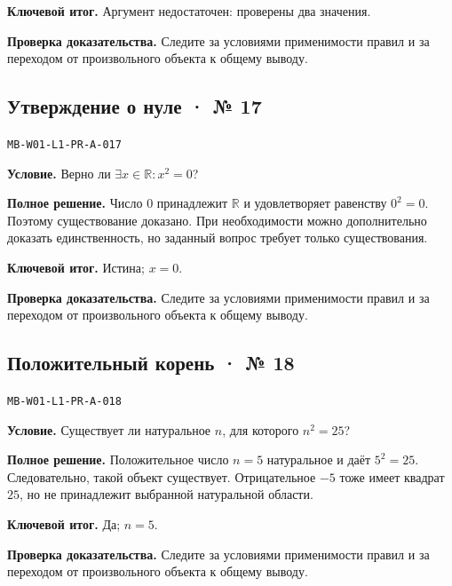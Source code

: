 \documentclass[11pt,a4paper,openany]{book}
\newcommand{\muid}[1]{\texttt{\footnotesize #1}}
\begin{document}
\begin{learnbox}\textbf{Ключевой итог.} Аргумент недостаточен: проверены два значения.\par \textbf{Проверка доказательства.} 
Следите за условиями применимости правил и за переходом от произвольного объекта к общему выводу. 
\end{learnbox}

\subsection*{Утверждение о нуле · № 17}\hypertarget{solution:MB-W01-L1-PR-A-017}{}

\muid{MB-W01-L1-PR-A-017}\par

\textbf{Условие.} Верно ли $\exists x\in\mathbb R\colon x^2=0$?\par

\textbf{Полное решение.} Число $0$ принадлежит $\mathbb R$ и удовлетворяет равенству $0^2=0$. Поэтому существование доказано. При необходимости можно дополнительно доказать единственность, но заданный вопрос требует только существования.


\begin{learnbox}\textbf{Ключевой итог.} Истина; $x=0$.\par \textbf{Проверка доказательства.} 
Следите за условиями применимости правил и за переходом от произвольного объекта к общему выводу. 
\end{learnbox}

\subsection*{Положительный корень · № 18}\hypertarget{solution:MB-W01-L1-PR-A-018}{}

\muid{MB-W01-L1-PR-A-018}\par

\textbf{Условие.} Существует ли натуральное $n$, для которого $n^2=25$?\par

\textbf{Полное решение.} Положительное число $n=5$ натуральное и даёт $5^2=25$. Следовательно, такой объект существует. Отрицательное $-5$ тоже имеет квадрат $25$, но не принадлежит выбранной натуральной области.


\begin{learnbox}\textbf{Ключевой итог.} Да; $n=5$.\par \textbf{Проверка доказательства.} 
Следите за условиями применимости правил и за переходом от произвольного объекта к общему выводу. 
\end{learnbox}
\end{document}
